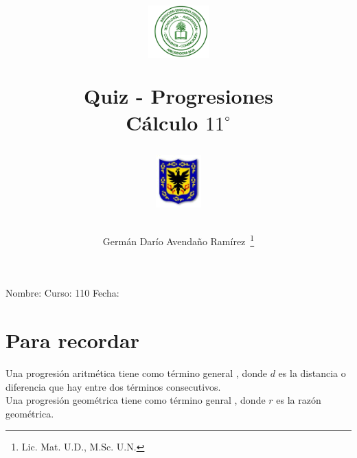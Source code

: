 \documentclass[11pt]{article}
\author{Germ\'an Dar\'io Avenda\~no Ram\'irez~\thanks{Lic. Mat. U.D., M.Sc. U.N.}}
\title{\begin{minipage}{0.15\textwidth}\includegraphics[height=2cm]{Images/logo-colegio.png}
\end{minipage}\hfill \begin{minipage}{0.7\textwidth}\begin{center}
Quiz - Progresiones\\Cálculo $11^{\circ}$\end{center}
\end{minipage}\hfill
\begin{minipage}{0.15\textwidth}
\includegraphics[height=2cm]{Images/logo-sed.png} 
\end{minipage}}
\date{}
\begin{document}
\maketitle
Nombre: \hrulefill Curso: 110\underline{\hspace{12pt}}  Fecha: \underline{\hspace{2cm}}
\section*{Para recordar}
Una progresi\'on aritmética tiene como término general , donde $d$ es la distancia o diferencia que hay entre dos términos consecutivos.\\

Una progresión geométrica tiene como término genral ,
donde $r$ es la razón geométrica.
\end{document}
